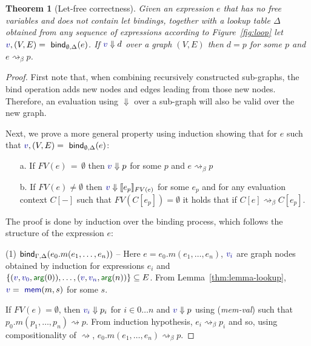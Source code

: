 \documentclass[sigplan,10pt,review,anonymous]{acmart}\settopmatter{printfolios=true,printccs=false,printacmref=false}
\newcounter{thc}
\theoremstyle{plain}
\newtheorem{theorem}[thc]{Theorem}
\theoremstyle{definition}
\newcommand{\ident}[1]{\textnormal{\sffamily #1}}
\newcommand{\bndclr}[1]{\textcolor{kvdclr}{#1}}
\newcommand{\bnd}[1]{\textnormal{\textcolor{kvdclr}{\sffamily #1}}}
\newcommand{\blbl}[1]{\textnormal{\textcolor{numclr}{\sffamily #1}}}
\begin{document}
\setcounter{thc}{-1}
\begin{theorem}[Let-free correctness]
Given an expression $e$ that has no free variables and does not contain let bindings, together
with a lookup table $\Delta$ obtained from any sequence of expressions according to Figure~\ref{fig:loop}
let $\bndclr{v}, (V, E) = \ident{bind}_{\emptyset, \Delta}(e)$. If $\bndclr{v}\Downarrow d$ 
over a graph $(V, E)$ then $d = p$ for some $p$ and $e \rightsquigarrow_\beta p$.
\end{theorem}
\begin{proof}
First note that, when combining recursively constructed sub-graphs, the \ident{bind} operation
adds new nodes and edges leading from those new nodes. Therefore, an evaluation using $\Downarrow$
over a sub-graph will also be valid over the new graph.

Next, we prove a more general property using induction showing that for $e$ such 
that $\bndclr{v}, (V, E) = \ident{bind}_{\emptyset, \Delta}(e)$:
\begin{enumerate}
\item[a.] If $FV(e)\,=\,\emptyset$ then $\bndclr{v} \Downarrow p$ for some $p$ and $e \rightsquigarrow_\beta p$
\item[b.] If $FV(e)\neq\emptyset$ then $\bndclr{v} \Downarrow \llbracket e_p \rrbracket_{FV(e)}$ for some $e_p$ and
  for any evaluation context $C[-]$ such that $FV(C[e_p])=\emptyset$ it holds that if
  $C[e] \rightsquigarrow_\beta C[e_p]$.  
\end{enumerate}

The proof is done by induction over the binding process, which follows the structure 
of the expression $e$:

\vspace{0.75em}\noindent(1) $\ident{bind}_{\Gamma, \Delta}(e_0.m(e_1, \ldots, e_n))$ -- 
  Here $e = e_0.m(e_1, \ldots, e_n)$, $\bndclr{v_i}$ are graph nodes obtained by induction for
  expressions $e_i$ and $\{ (\bndclr{v}, \bndclr{v_0}, \blbl{arg}(0)), \ldots, (\bndclr{v}, \bndclr{v_n}, \blbl{arg}(n))\} \subseteq E$.
  From Lemma~\ref{thm:lemma-lookup}, $\bndclr{v} = \bnd{mem}(m, s)$ for some $s$.
  
  If $FV(e)=\emptyset$, then $\bndclr{v_i} \Downarrow p_i$ for $i\in 0\ldots n$ and 
  $\bndclr{v}\Downarrow p$ using (\emph{mem-val}) such that $p_0.m(p_1, \ldots, p_n) \rightsquigarrow p$. 
  From induction hypothesis, $e_i \rightsquigarrow_\beta p_i$ and so, using compositionality of $\rightsquigarrow$, 
  $e_0.m(e_1, \ldots, e_n) \rightsquigarrow_\beta p$.
  

\end{proof}
\end{document}
